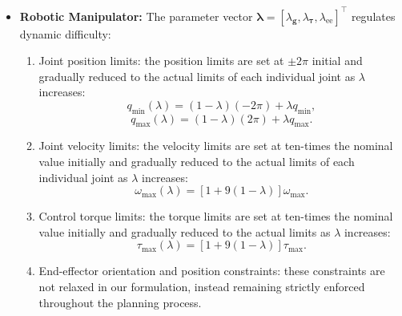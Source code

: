 \begin{itemize}
    \item \textbf{Robotic Manipulator:} 
    The parameter vector $\boldsymbol{\lambda} = [\lambda_{\mathbf{g}}, \lambda_{\boldsymbol{\tau}}, \lambda_{\text{ee}}]^\top$ regulates dynamic difficulty:
    \begin{enumerate}
        \item Joint position limits: the position limits are set at $\pm 2\pi$ initial and gradually reduced to the actual limits of each individual joint as $\lambda$ increases:
            \begin{equation}
                q_{\min}(\lambda) = (1 - \lambda)(-2\pi) + \lambda q_{\min},
            \end{equation}
            \begin{equation}
                q_{\max}(\lambda) = (1 - \lambda)(2\pi) + \lambda q_{\max}.
            \end{equation}
        \item Joint velocity limits: the velocity limits are set at ten-times the nominal value initially and gradually reduced to the actual limits of each individual joint as $\lambda$ increases:
            \begin{equation}
                \omega_{\max}(\lambda) = [1+9(1-\lambda)]\omega_{\max}.
            \end{equation}
        \item Control torque limits: the torque limits are set at ten-times the nominal value initially and gradually reduced to the actual limits as $\lambda$ increases:
            \begin{equation}
                \tau_{\max}(\lambda) = [1+9(1-\lambda)]\tau_{\max}.
            \end{equation}
        \item End-effector orientation and position constraints: these constraints are not relaxed in our formulation, instead remaining strictly enforced throughout the planning process.
    \end{enumerate}
\end{itemize}

